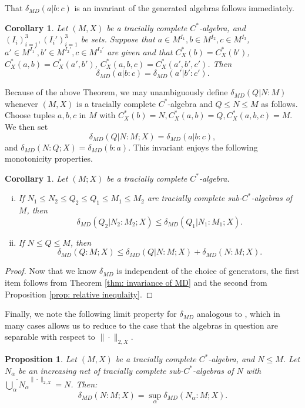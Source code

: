 \documentclass[10pt]{amsart}
\newtheorem{prop}[thm]{Proposition}
\newtheorem{cor}[thm]{Corollary}
\theoremstyle{definition}
\numberwithin{equation}{section}
\begin{document}
That $\delta_{MD}(a|b:c)$ is an invariant of the generated algebras follows immediately. 

\begin{cor}
Let $(M,X)$ be a tracially complete $C^{*}$-algebra, and $(I_{i})_{i=1}^{3},(I_{i}')_{i=1}^{3}$ be sets. Suppose that $a\in M^{I_{1}},b\in M^{I_{2}},c\in M^{I_{3}}$, $a'\in M^{I_{1}'},b'\in M^{I_{2}'},c\in M^{I_{3}'}$ are given and that $C^{*}_{X}(b)=C^{*}_{X}(b')$, $C^{*}_{X}(a,b)=C^{*}_{X}(a',b')$, $C^{*}_{X}(a,b,c)=C^{*}_{X}(a',b',c')$. Then
\[\delta_{MD}(a|b:c)=\delta_{MD}(a'|b':c').\]
\end{cor}

Because of the above Theorem, we may unambiguously define $\delta_{MD}(Q|N:M)$ whenever $(M,X)$ is a tracially complete $C^{*}$-algebra and $Q\leq N\leq M$ as follows. Choose tuples $a,b,c$ in $M$ with $C^{*}_{X}(b)=N,C^{*}_{X}(a,b)=Q,C^{*}_{X}(a,b,c)=M$. We then set
\[\delta_{MD}(Q|N:M;X)=\delta_{MD}(a|b:c),\]
and $\delta_{MD}(N:Q;X)=\delta_{MD}(b:a)$.
This invariant enjoys the following monotonicity properties. 
\begin{cor}\label{cor:basic properties}
Let $(M;X)$ be a tracially complete $C^{*}$-algebra.
\begin{enumerate}[(i)]
    \item If $N_{1}\leq N_{2}\leq Q_{2}\leq Q_{1}\leq M_{1}\leq M_{2}$ are tracially complete sub-$C^{*}$-algebras of $M$, then
\[\delta_{MD}(Q_{2}|N_{2}:M_{2};X)\leq \delta_{MD}(Q_{1}|N_{1}:M_{1};X).\]
\item If $N\leq Q\leq M$, then
\[\delta_{MD}(Q:M;X)\leq \delta_{MD}(Q|N:M;X)+\delta_{MD}(N:M;X).\]
\end{enumerate}
\end{cor}

\begin{proof}
Now that we know $\delta_{MD}$ is independent of the choice of generators, the first item follows from Theorem \ref{thm: invariance of MD} and the second from Proposition \ref{prop: relative inequlaity}.
\end{proof}

Finally, we note the following limit property for $\delta_{MD}$ analogous to \cite[Lemma A.10]{Hayes2018}, which in many cases allows us to reduce to the case that the algebras in question are separable with respect to $\|\cdot\|_{2,X}$. 

\begin{prop}\label{prop: limiting formula for MD}
 Let $(M,X)$ be a tracially complete $C^{*}$-algebra, and $N\leq M$. Let $N_{\alpha}$ be an increasing net of tracially complete sub-$C^{*}$-algebras of $N$ with $\overline{\bigcup_{\alpha}N_{\alpha}}^{\|\cdot\|_{2,X}}=N$. Then:
 \[\delta_{MD}(N:M;X)=\sup_{\alpha}\delta_{MD}(N_{\alpha}:M;X).\]
\end{prop}
\end{document}
